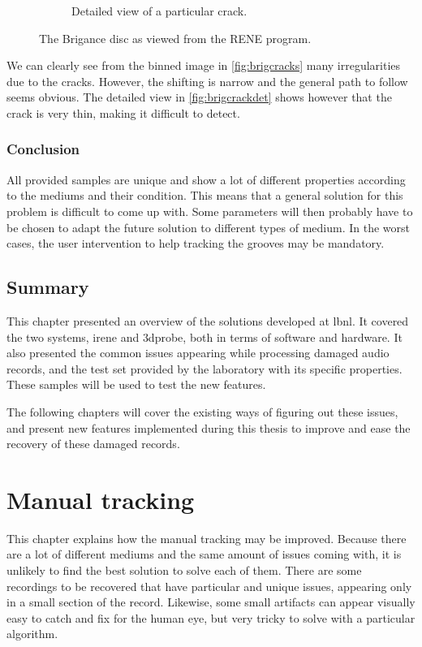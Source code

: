 \begin{figure}[!ht]
\begin{subfigure}[t]{0.45\textwidth}
    \caption{Detailed view of a particular crack.}
    \label{fig:brigcrackdet}
    \end{subfigure}
    \caption{The Brigance disc as viewed from the RENE program.}
    \label{fig:brigdamage}
\end{figure}

We can clearly see from the binned image in \autoref{fig:brigcracks} many irregularities due to the cracks. However, the shifting is narrow and the general path to follow seems obvious. The detailed view in \autoref{fig:brigcrackdet} shows however that the crack is very thin, making it difficult to detect.

\subsection{Conclusion}

All provided samples are unique and show a lot of different properties according to the mediums and their condition. This means that a general solution for this problem is difficult to come up with. Some parameters will then probably have to be chosen to adapt the future solution to different types of medium. In the worst cases, the user intervention to help tracking the grooves may be mandatory.

\section{Summary}

This chapter presented an overview of the solutions developed at \gls{lbnl}. It covered the two systems, \gls{irene} and \gls{3dprobe}, both in terms of software and hardware. It also presented the common issues appearing while processing damaged audio records, and the test set provided by the laboratory with its specific properties. These samples will be used to test the new features.

The following chapters will cover the existing ways of figuring out these issues, and present new features implemented during this thesis to improve and ease the recovery of these damaged records.

\chapter{Manual tracking}
\label{chap:mantrack}

This chapter explains how the manual tracking may be improved. Because there are a lot of different mediums and the same amount of issues coming with, it is unlikely to find the best solution to solve each of them. There are some recordings to be recovered that have particular and unique issues, appearing only in a small section of the record. Likewise, some small artifacts can appear visually easy to catch and fix for the human eye, but very tricky to solve with a particular algorithm.

